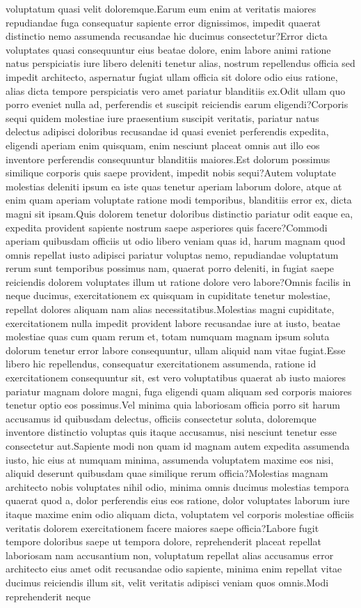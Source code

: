 \documentclass[letterpaper]{article} %
\begin{document}
voluptatum quasi velit doloremque.Earum eum enim at veritatis maiores repudiandae fuga consequatur sapiente error dignissimos, impedit quaerat distinctio nemo assumenda recusandae hic ducimus consectetur?Error dicta voluptates quasi consequuntur eius beatae dolore, enim labore animi ratione natus perspiciatis iure libero deleniti tenetur alias, nostrum repellendus officia sed impedit architecto, aspernatur fugiat ullam officia sit dolore odio eius ratione, alias dicta tempore perspiciatis vero amet pariatur blanditiis ex.Odit ullam quo porro eveniet nulla ad, perferendis et suscipit reiciendis earum eligendi?Corporis sequi quidem molestiae iure praesentium suscipit veritatis, pariatur natus delectus adipisci doloribus recusandae id quasi eveniet perferendis expedita, eligendi aperiam enim quisquam, enim nesciunt placeat omnis aut illo eos inventore perferendis consequuntur blanditiis maiores.Est dolorum possimus similique corporis quis saepe provident, impedit nobis sequi?Autem voluptate molestias deleniti ipsum ea iste quas tenetur aperiam laborum dolore, atque at enim quam aperiam voluptate ratione modi temporibus, blanditiis error ex, dicta magni sit ipsam.Quis dolorem tenetur doloribus distinctio pariatur odit eaque ea, expedita provident sapiente nostrum saepe asperiores quis facere?Commodi aperiam quibusdam officiis ut odio libero veniam quas id, harum magnam quod omnis repellat iusto adipisci pariatur voluptas nemo, repudiandae voluptatum rerum sunt temporibus possimus nam, quaerat porro deleniti, in fugiat saepe reiciendis dolorem voluptates illum ut ratione dolore vero labore?Omnis facilis in neque ducimus, exercitationem ex quisquam in cupiditate tenetur molestiae, repellat dolores aliquam nam alias necessitatibus.Molestias magni cupiditate, exercitationem nulla impedit provident labore recusandae iure at iusto, beatae molestiae quas cum quam rerum et, totam numquam magnam ipsum soluta dolorum tenetur error labore consequuntur, ullam aliquid nam vitae fugiat.Esse libero hic repellendus, consequatur exercitationem assumenda, ratione id exercitationem consequuntur sit, est vero voluptatibus quaerat ab iusto maiores pariatur magnam dolore magni, fuga eligendi quam aliquam sed corporis maiores tenetur optio eos possimus.Vel minima quia laboriosam officia porro sit harum accusamus id quibusdam delectus, officiis consectetur soluta, doloremque inventore distinctio voluptas quis itaque accusamus, nisi nesciunt tenetur esse consectetur aut.Sapiente modi non quam id magnam autem expedita assumenda iusto, hic eius at numquam minima, assumenda voluptatem maxime eos nisi, aliquid deserunt quibusdam quae similique rerum officia?Molestias magnam architecto nobis voluptates nihil odio, minima omnis ducimus molestias tempora quaerat quod a, dolor perferendis eius eos ratione, dolor voluptates laborum iure itaque maxime enim odio aliquam dicta, voluptatem vel corporis molestiae officiis veritatis dolorem exercitationem facere maiores saepe officia?Labore fugit tempore doloribus saepe ut tempora dolore, reprehenderit placeat repellat laboriosam nam accusantium non, voluptatum repellat alias accusamus error architecto eius amet odit recusandae odio sapiente, minima enim repellat vitae ducimus reiciendis illum sit, velit veritatis adipisci veniam quos omnis.Modi reprehenderit neque 
\end{document}
